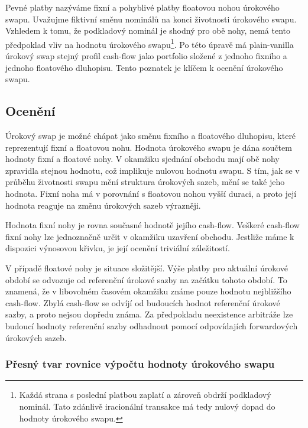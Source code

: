 \documentclass[a4paper]{book}
\begin{document}
Pevné platby nazýváme fixní a pohyblivé platby floatovou nohou úrokového swapu. Uvažujme fiktivní směnu nominálů na konci životnosti úrokového swapu. Vzhledem k tomu, že podkladový nominál je shodný pro obě nohy, nemá tento předpoklad vliv na hodnotu úrokového swapu\footnote{Každá strana s poslední platbou zaplatí a zároveň obdrží podkladový nominál. Tato zdánlivě iracionální transakce má tedy nulový dopad do hodnoty úrokového swapu.}. Po této úpravě má plain-vanilla úrokový swap stejný profil cash-flow jako portfolio složené z jednoho fixního a jednoho floatového dluhopisu. Tento poznatek je klíčem k ocenění úrokového swapu.

\subsection{Ocenění}

Úrokový swap je možné chápat jako směnu fixního a floatového dluhopisu, které reprezentují fixní a floatovou nohu. Hodnota úrokového swapu je dána součtem hodnoty fixní a floatové nohy. V okamžiku sjednání obchodu mají obě nohy zpravidla stejnou hodnotu, což implikuje nulovou hodnotu swapu. S tím, jak se v průběhu životnosti swapu mění struktura úrokových sazeb, mění se také jeho hodnota. Fixní noha má v porovnání s floatovou nohou vyšší duraci, a proto její hodnota reaguje na změnu úrokových sazeb výrazněji.

Hodnota fixní nohy je rovna současné hodnotě jejího cash-flow. Veškeré cash-flow fixní nohy lze jednoznačně určit v okamžiku uzavření obchodu. Jestliže máme k dispozici výnosovou křivku, je její ocenění triviální záležitostí. 

V případě floatové nohy je situace složitější. Výše platby pro aktuální úrokové období se odvozuje od referenční úrokové sazby na začátku tohoto období. To znamená, že v libovolném časovém okamžiku známe pouze hodnotu nejbližšího cash-flow. Zbylá cash-flow se odvíjí od budoucích hodnot referenční úrokové sazby, a proto nejsou dopředu známa. Za předpokladu neexistence arbitráže lze budoucí hodnoty referenční sazby odhadnout pomocí odpovídajích forwardových úrokových sazeb.

\subsubsection{Přesný tvar rovnice výpočtu hodnoty úrokového swapu}
\end{document}
